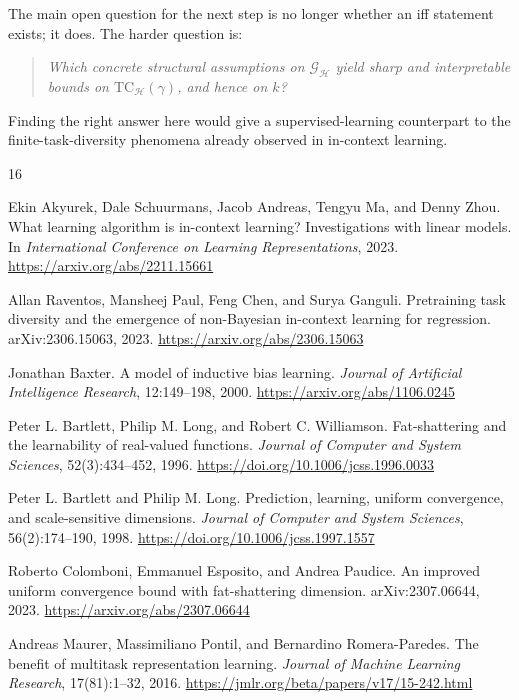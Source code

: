 \documentclass[11pt]{article}
\theoremstyle{definition}
\begin{document}
The main open question for the next step is no longer whether an iff statement exists; it does. The harder question is:
\begin{quote}
\itshape
Which concrete structural assumptions on $\mathcal{G}_{\mathcal{H}}$ yield sharp and interpretable bounds on $\mathrm{TC}_{\mathcal{H}}(\gamma)$, and hence on $k$?
\end{quote}
Finding the right answer here would give a supervised-learning counterpart to the finite-task-diversity phenomena already observed in in-context learning.

\begin{thebibliography}{16}

Ekin Akyurek, Dale Schuurmans, Jacob Andreas, Tengyu Ma, and Denny Zhou.
\newblock What learning algorithm is in-context learning? Investigations with linear models.
\newblock In \emph{International Conference on Learning Representations}, 2023.
\newblock \url{https://arxiv.org/abs/2211.15661}

Allan Raventos, Mansheej Paul, Feng Chen, and Surya Ganguli.
\newblock Pretraining task diversity and the emergence of non-Bayesian in-context learning for regression.
\newblock arXiv:2306.15063, 2023.
\newblock \url{https://arxiv.org/abs/2306.15063}

Jonathan Baxter.
\newblock A model of inductive bias learning.
\newblock \emph{Journal of Artificial Intelligence Research}, 12:149--198, 2000.
\newblock \url{https://arxiv.org/abs/1106.0245}

Peter L. Bartlett, Philip M. Long, and Robert C. Williamson.
\newblock Fat-shattering and the learnability of real-valued functions.
\newblock \emph{Journal of Computer and System Sciences}, 52(3):434--452, 1996.
\newblock \url{https://doi.org/10.1006/jcss.1996.0033}

Peter L. Bartlett and Philip M. Long.
\newblock Prediction, learning, uniform convergence, and scale-sensitive dimensions.
\newblock \emph{Journal of Computer and System Sciences}, 56(2):174--190, 1998.
\newblock \url{https://doi.org/10.1006/jcss.1997.1557}

Roberto Colomboni, Emmanuel Esposito, and Andrea Paudice.
\newblock An improved uniform convergence bound with fat-shattering dimension.
\newblock arXiv:2307.06644, 2023.
\newblock \url{https://arxiv.org/abs/2307.06644}

Andreas Maurer, Massimiliano Pontil, and Bernardino Romera-Paredes.
\newblock The benefit of multitask representation learning.
\newblock \emph{Journal of Machine Learning Research}, 17(81):1--32, 2016.
\newblock \url{https://jmlr.org/beta/papers/v17/15-242.html}


\end{thebibliography}
\end{document}
